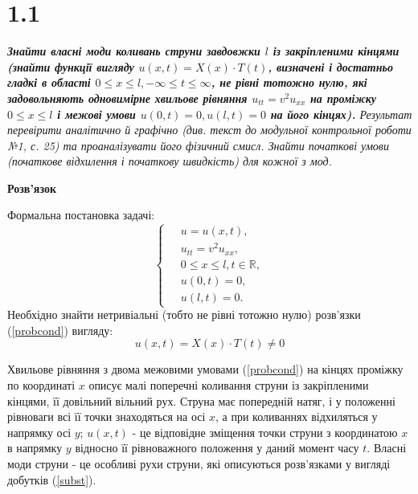 

%

\section[Задача №1.1]{1.1}

\textit{\textbf{Знайти власні моди коливань струни завдовжки $l$ із закріпленими кінцями (знайти функції вигляду $u(x,t) = X(x) \cdot T(t)$, визначені і достатньо гладкі в області $0 \leq x \leq l, -\infty \leq t \leq \infty$, не рівні тотожно нулю, які задовольняють одновимірне хвильове рівняння $u_{tt} = v^2 u_{xx}$ на проміжку $0 \leq x \leq l$ і межові умови $u(0,t) = 0, u(l,t) = 0$ на його кінцях).} Результат перевірити аналітично й графічно (див. текст до модульної контрольної роботи №1, с. 25) та проаналізувати його фізичний смисл. Знайти початкові умови (початкове відхилення і початкову швидкість) для кожної з мод.}

\begin{center}
    \large{\textbf{Розв'язок}}
\end{center}

\noindent Формальна постановка задачі:
\begin{equation} \label{probcond}
    \left\{ \begin{aligned} %
        \;&u = u(x,t), \\
          &u_{tt} = v^2 u_{xx}, \\
          &0 \leq x \leq l, t \in \mathbb{R}, \\
          &u(0,t) = 0, \\
          &u(l,t) = 0. 
    \end{aligned} \right.
\end{equation}
Необхідно знайти нетривіальні (тобто не рівні тотожно нулю) розв'язки (\ref{probcond}) вигляду:
\begin{equation} \label{subst}
    u(x,t) = X(x) \cdot T(t) \neq 0 
\end{equation}

Хвильове рівняння з двома межовими умовами (\ref{probcond}) на кінцях проміжку по координаті $x$ описує малі поперечні коливання струни із закріпленими кінцями, її довільний вільний рух. Струна має попередній натяг, і у положенні рівноваги  всі її точки знаходяться на осі $x$, а при коливаннях відхиляться у напрямку осі $y$; $u(x,t)$ - це відповідне зміщення точки струни з координатою $x$ в напрямку $y$ відносно її рівноважного положення у даний момент часу $t$. Власні моди струни - це особливі рухи струни, які описуються розв'язками у вигляді добутків (\ref{subst}). 

